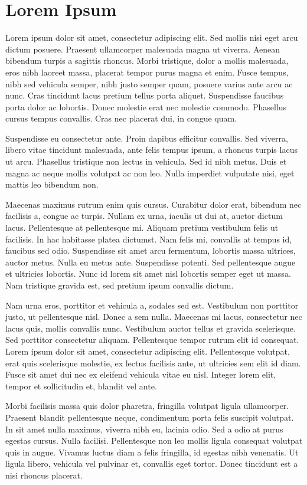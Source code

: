 \chapter{Lorem Ipsum}
\label{kap:lorem}

Lorem ipsum dolor sit amet, consectetur adipiscing elit. Sed mollis nisi eget arcu dictum posuere. Praesent ullamcorper malesuada magna ut viverra. Aenean bibendum turpis a sagittis rhoncus. Morbi tristique, dolor a mollis malesuada, eros nibh laoreet massa, placerat tempor purus magna et enim. Fusce tempus, nibh sed vehicula semper, nibh justo semper quam, posuere varius ante arcu ac nunc. Cras tincidunt lacus pretium tellus porta aliquet. Suspendisse faucibus porta dolor ac lobortis. Donec molestie erat nec molestie commodo. Phasellus cursus tempus convallis. Cras nec placerat dui, in congue quam.

Suspendisse eu consectetur ante. Proin dapibus efficitur convallis. Sed viverra, libero vitae tincidunt malesuada, ante felis tempus ipsum, a rhoncus turpis lacus ut arcu. Phasellus tristique non lectus in vehicula. Sed id nibh metus. Duis et magna ac neque mollis volutpat ac non leo. Nulla imperdiet vulputate nisi, eget mattis leo bibendum non.

Maecenas maximus rutrum enim quis cursus. Curabitur dolor erat, bibendum nec facilisis a, congue ac turpis. Nullam ex urna, iaculis ut dui at, auctor dictum lacus. Pellentesque at pellentesque mi. Aliquam pretium vestibulum felis ut facilisis. In hac habitasse platea dictumst. Nam felis mi, convallis at tempus id, faucibus sed odio. Suspendisse sit amet arcu fermentum, lobortis massa ultrices, auctor metus. Nulla eu metus ante. Suspendisse potenti. Sed pellentesque augue et ultricies lobortis. Nunc id lorem sit amet nisl lobortis semper eget ut massa. Nam tristique gravida est, sed pretium ipsum convallis dictum.

Nam urna eros, porttitor et vehicula a, sodales sed est. Vestibulum non porttitor justo, ut pellentesque nisl. Donec a sem nulla. Maecenas mi lacus, consectetur nec lacus quis, mollis convallis nunc. Vestibulum auctor tellus et gravida scelerisque. Sed porttitor consectetur aliquam. Pellentesque tempor rutrum elit id consequat. Lorem ipsum dolor sit amet, consectetur adipiscing elit. Pellentesque volutpat, erat quis scelerisque molestie, ex lectus facilisis ante, ut ultricies sem elit id diam. Fusce sit amet dui nec ex eleifend vehicula vitae eu nisl. Integer lorem elit, tempor et sollicitudin et, blandit vel ante.


Morbi facilisis massa quis dolor pharetra, fringilla volutpat ligula ullamcorper. Praesent blandit pellentesque neque, condimentum porta felis suscipit volutpat. In sit amet nulla maximus, viverra nibh eu, lacinia odio. Sed a odio at purus egestas cursus. Nulla facilisi. Pellentesque non leo mollis ligula consequat volutpat quis in augue. Vivamus luctus diam a felis fringilla, id egestas nibh venenatis. Ut ligula libero, vehicula vel pulvinar et, convallis eget tortor. Donec tincidunt est a nisi rhoncus placerat.

